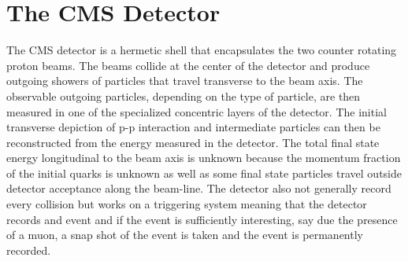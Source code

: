 


\section{The CMS Detector}

The CMS detector is a hermetic shell that encapsulates the two counter rotating proton beams. The beams collide at the center of the detector and produce outgoing showers of particles that travel transverse to the beam axis. The observable outgoing particles, depending on the type of particle, are then measured in one of the specialized concentric layers of the detector. The initial transverse depiction of p-p interaction and intermediate particles can then be reconstructed from the energy measured in the detector. The total final state energy longitudinal to the beam axis is unknown because the momentum fraction of the initial quarks is unknown as well as some final state particles travel outside detector acceptance along the beam-line.  The detector also not generally record every collision but works on a triggering system meaning that the detector records and event and if the event is sufficiently interesting, say due the presence of a muon, a snap shot of the event is taken and the event is permanently recorded.

